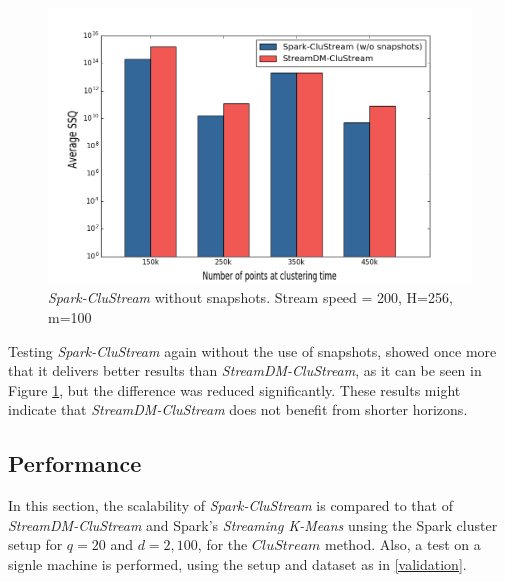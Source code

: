 \documentclass[10pt, conference, compsocconf]{IEEEtran}
\begin{document}
\begin{figure}[h]
 \centering
 \includegraphics[scale=0.35]{./styles/comparisonNoSnaps2.png}
 \caption{\textit{Spark-CluStream} without snapshots. Stream speed = 200, H=256, m=100}
 \label{fig:comparisonNoSnaps2}
\end{figure}

Testing \textit{Spark-CluStream} again without the use of snapshots, showed once more that it delivers better results than \textit{StreamDM-CluStream}, as it can be seen in Figure \ref{fig:comparisonNoSnaps2}, but the difference was reduced significantly. These results might indicate that \textit{StreamDM-CluStream} does not benefit from shorter horizons.

\subsection{Performance}

In this section, the scalability of \textit{Spark-CluStream} is compared to that of \textit{StreamDM-CluStream} and Spark's \textit{Streaming K-Means} unsing the Spark cluster setup for $q=20$ and $d=2,100$, for the $CluStream$ method. Also, a test on a signle machine is performed, using the setup and dataset as in \ref{validation}.
\end{document}
